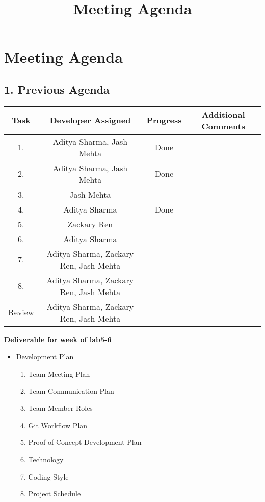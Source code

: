 \documentclass[11pt, oneside]{article}   	%
\title{Meeting Agenda}
\author{}
\begin{document}
\setlength{\headsep}{50pt}
\section*{Meeting Agenda}

\subsection*{1. Previous Agenda}
\begin{center}
\begin{tabular}{ | c | c | c | c | }
\hline
Task & Developer Assigned & Progress & Additional Comments\\
\hline
1. & Aditya Sharma, Jash Mehta & Done &\\
\hline
2. & Aditya Sharma, Jash Mehta & Done &\\
\hline
3. & Jash Mehta & &\\
\hline
4. & Aditya Sharma & Done &\\
\hline
5. & Zackary Ren & &\\
\hline
6. & Aditya Sharma & &\\
\hline
7. & Aditya Sharma, Zackary Ren, Jash Mehta & &\\
\hline
8. & Aditya Sharma, Zackary Ren, Jash Mehta & &\\
\hline
Review & Aditya Sharma, Zackary Ren, Jash Mehta & &\\
\hline
\end{tabular}
\end{center}

\textbf{Deliverable for week of lab5-6}
\begin{itemize}
\item Development Plan
\begin{enumerate}
\item Team Meeting Plan
\item Team Communication Plan
\item Team Member Roles
\item Git Workflow Plan
\item Proof of Concept Development Plan
\item Technology
\item Coding Style
\item Project Schedule
\end{enumerate}
\end{itemize}
\newpage{}
\end{document}
